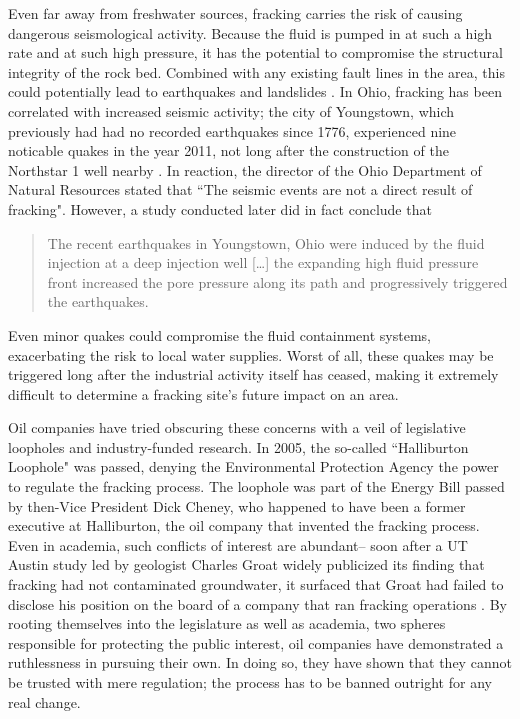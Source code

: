 \documentclass[12pt,letterpaper]{article}
\begin{document}
Even far away from freshwater sources, fracking carries the risk of causing dangerous seismological activity. Because the fluid is pumped in at such a high rate and at such high pressure, it has the potential to compromise the structural integrity of the rock bed. Combined with any existing fault lines in the area, this could potentially lead to earthquakes and landslides \cite{quake}.
In Ohio, fracking has been correlated with increased seismic activity; the city of Youngstown, which previously had had no recorded earthquakes since 1776, experienced nine noticable quakes in the year 2011, not long after the construction of the Northstar 1 well nearby \cite{quake2}. In reaction, the director of the Ohio Department of Natural Resources stated that
``The seismic events are not a direct result of fracking". However, a study conducted later did in fact conclude that
\begin{quote}
The recent earthquakes in Youngstown, Ohio were induced by the fluid injection at a deep injection well [\ldots] the expanding high fluid pressure front increased the pore pressure along its path and progressively triggered the earthquakes. \cite[1]{quake3}
\end{quote}
Even minor quakes could compromise the fluid containment systems, exacerbating the risk to local water supplies. Worst of all, these quakes may be triggered long after the industrial activity itself has ceased, making it extremely difficult to determine a fracking site's future impact on an area.

Oil companies have tried obscuring these concerns with a veil of legislative loopholes and industry-funded research. In 2005, the so-called ``Halliburton Loophole" was passed, denying the Environmental Protection Agency the power to regulate the fracking process. The loophole was part of the Energy Bill passed by then-Vice President Dick Cheney, who happened to have been a former executive at Halliburton, the oil company that invented the fracking process. Even in academia, such conflicts of interest are abundant-- soon after a UT Austin study led by geologist Charles Groat widely publicized its finding that fracking had not contaminated groundwater, it surfaced that Groat had failed to disclose his position on the board of a company that ran fracking operations \cite{groat}.
By rooting themselves into the legislature as well as academia, two spheres responsible for protecting the public interest, oil companies have demonstrated a ruthlessness in pursuing their own.
In doing so, they have shown that they cannot be trusted with mere regulation; the process has to be banned outright for any real change.
\end{document}

